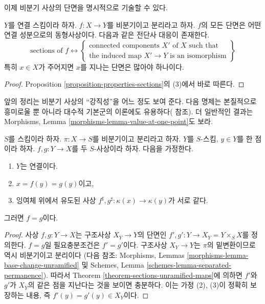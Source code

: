 \noindent
이제 비분기 사상의 단면을 명시적으로 기술할 수 있다.

\begin{theorem}
\label{theorem-sections-unramified-maps}
$Y$를 연결 스킴이라 하자.
$f : X \to Y$를 비분기이고 분리라고 하자.
$f$의 모든 단면은 어떤 연결 성분으로의 동형사상이다.
다음과 같은 전단사 대응이 존재한다.
$$
\text{sections of }f
\leftrightarrow
\left\{
\begin{matrix}
\text{connected components }X'\text{ of }X\text{ such that}\\
\text{the induced map }X' \to Y\text{ is an isomorphism}
\end{matrix}
\right\}
$$
특히 $x \in X$가 주어지면 $x$를 지나는 단면은 많아야 하나이다.
\end{theorem}

\begin{proof}
Proposition \ref{proposition-properties-sections}의 (3)에서 바로 따른다.
\end{proof}

\noindent
앞의 정리는 비분기 사상의 “강직성”을 어느 정도 보여 준다.
다음 명제는 본질적으로 흥미로울 뿐 아니라 대수적 기본군의 이론에도
유용하다( \cite[Expos\'e V]{SGA1} 참조).
더 일반적인 결과는 Morphisms, Lemma
\ref{morphisms-lemma-value-at-one-point}도 보라.

\begin{proposition}
\label{proposition-equality}
$S$를 스킴이라 하자.
$\pi : X \to S$를 비분기이고 분리라고 하자.
$Y$를 $S$-스킴, $y \in Y$를 한 점이라 하자.
$f, g : Y \to X$를 두 $S$-사상이라 하자. 다음을 가정한다.
\begin{enumerate}
\item $Y$는 연결이다.
\item $x = f(y) = g(y)$이고,
\item 잉여체 위에서 유도된 사상
$f^\sharp, g^\sharp : \kappa(x) \to \kappa(y)$가 서로 같다.
\end{enumerate}
그러면 $f = g$이다.
\end{proposition}

\begin{proof}
사상 $f, g : Y \to X$는 구조사상 $X_Y \to Y$의 단면인
$f', g' : Y \to X_Y = Y \times_S X$를 정의한다.
$f = g$일 필요충분조건은 $f' = g'$이다.
구조사상 $X_Y \to Y$는 $\pi$의 밑변환이므로 역시 비분기이고 분리이다
(다음 참조:
Morphisms, Lemmas \ref{morphisms-lemma-base-change-unramified} 및
Schemes, Lemma \ref{schemes-lemma-separated-permanence}).
따라서 Theorem \ref{theorem-sections-unramified-maps}에 의하면
$f'$와 $g'$가 $X_Y$의 같은 점을 지난다는 것을 보이면 충분하다.
이는 가정 (2), (3)이 정확히 보장하는 내용, 즉
$f'(y) = g'(y) \in X_Y$이다.
\end{proof}

